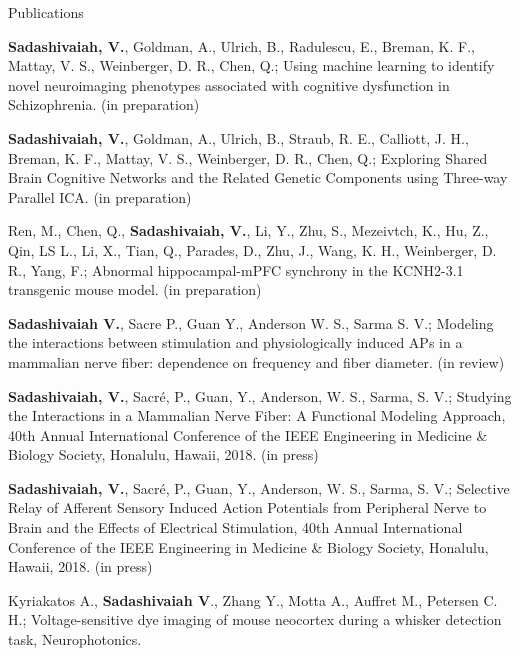 \documentclass{resume}
\begin{document}
\vspace{1em} 

\begin{rSection}{Publications}
\begin{publications}
\item \textbf{Sadashivaiah, V.}, Goldman, A., Ulrich, B., Radulescu, E., Breman, K. F., Mattay, V. S., Weinberger, D. R., Chen, Q.; Using machine learning to identify novel neuroimaging phenotypes associated with cognitive dysfunction in Schizophrenia. (in preparation)
 
\item \textbf{Sadashivaiah, V.}, Goldman, A., Ulrich, B., Straub, R. E., Calliott, J. H., Breman, K. F., Mattay, V. S., Weinberger, D. R., Chen, Q.; Exploring Shared Brain Cognitive Networks and the Related Genetic Components using Three-way Parallel ICA. (in preparation) 

\item Ren, M., Chen, Q., \textbf{Sadashivaiah, V.}, Li, Y., Zhu, S., Mezeivtch, K., Hu, Z.,  Qin, LS L., Li, X., Tian, Q., Parades, D., Zhu, J., Wang, K. H., Weinberger, D. R., Yang, F.; Abnormal hippocampal-mPFC synchrony in the KCNH2-3.1 transgenic mouse model. (in preparation)

\item \textbf{Sadashivaiah V.}, Sacre P., Guan Y., Anderson W. S., Sarma S. V.; Modeling the interactions between stimulation and physiologically induced APs in a mammalian nerve fiber: dependence on frequency and fiber diameter. (in review)

\item \textbf{Sadashivaiah, V.}, Sacré, P., Guan, Y., Anderson, W. S., Sarma, S. V.; Studying the Interactions in a Mammalian Nerve Fiber: A Functional Modeling Approach, 40th Annual International Conference of the IEEE Engineering in Medicine \& Biology Society, Honalulu, Hawaii, 2018. (in press)

\item \textbf{Sadashivaiah, V.}, Sacré, P., Guan, Y., Anderson, W. S., Sarma, S. V.; Selective Relay of Afferent Sensory Induced Action Potentials from Peripheral Nerve to Brain and the Effects of Electrical Stimulation, 40th Annual International Conference of the IEEE Engineering in Medicine \& Biology Society, Honalulu, Hawaii, 2018. (in press)

\item Kyriakatos A., \textbf{Sadashivaiah V}., Zhang Y., Motta A., Auffret M., Petersen C. H.; Voltage-sensitive dye imaging of mouse neocortex during a whisker detection task, Neurophotonics.


\end{publications}
\end{rSection}
\end{document}
